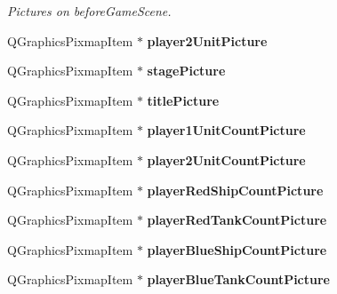 \begin{DoxyCompactItemize}
\begin{DoxyCompactList}\small\item\em Pictures on before\+Game\+Scene. \end{DoxyCompactList}\item 
Q\+Graphics\+Pixmap\+Item $\ast$ {\bfseries player2\+Unit\+Picture}\hypertarget{class_game_menu_af1854743b63b9756bfd6ce0761918e7e}{}\label{class_game_menu_af1854743b63b9756bfd6ce0761918e7e}

\item 
Q\+Graphics\+Pixmap\+Item $\ast$ {\bfseries stage\+Picture}\hypertarget{class_game_menu_ac9149690e856b17578f3f7fdb932f7a1}{}\label{class_game_menu_ac9149690e856b17578f3f7fdb932f7a1}

\item 
Q\+Graphics\+Pixmap\+Item $\ast$ {\bfseries title\+Picture}\hypertarget{class_game_menu_ad6a103544d02d3cb04f33dfe35676c00}{}\label{class_game_menu_ad6a103544d02d3cb04f33dfe35676c00}

\item 
Q\+Graphics\+Pixmap\+Item $\ast$ {\bfseries player1\+Unit\+Count\+Picture}\hypertarget{class_game_menu_a1fb70748425976821089be584d3f3840}{}\label{class_game_menu_a1fb70748425976821089be584d3f3840}

\item 
Q\+Graphics\+Pixmap\+Item $\ast$ {\bfseries player2\+Unit\+Count\+Picture}\hypertarget{class_game_menu_aa68b9697560092eb9c78d10945df0b1f}{}\label{class_game_menu_aa68b9697560092eb9c78d10945df0b1f}

\item 
Q\+Graphics\+Pixmap\+Item $\ast$ {\bfseries player\+Red\+Ship\+Count\+Picture}\hypertarget{class_game_menu_a930dfe40b7944b923cba0573a1ac2e55}{}\label{class_game_menu_a930dfe40b7944b923cba0573a1ac2e55}

\item 
Q\+Graphics\+Pixmap\+Item $\ast$ {\bfseries player\+Red\+Tank\+Count\+Picture}\hypertarget{class_game_menu_a5e1eaab4a213cf591a8f795170385cec}{}\label{class_game_menu_a5e1eaab4a213cf591a8f795170385cec}

\item 
Q\+Graphics\+Pixmap\+Item $\ast$ {\bfseries player\+Blue\+Ship\+Count\+Picture}\hypertarget{class_game_menu_a7ed3930e5a8f355cd35a71324b83623f}{}\label{class_game_menu_a7ed3930e5a8f355cd35a71324b83623f}

\item 
Q\+Graphics\+Pixmap\+Item $\ast$ {\bfseries player\+Blue\+Tank\+Count\+Picture}\hypertarget{class_game_menu_a29de28479797b06dfe7dd9b45d5f028d}{}\label{class_game_menu_a29de28479797b06dfe7dd9b45d5f028d}


\end{DoxyCompactItemize}
